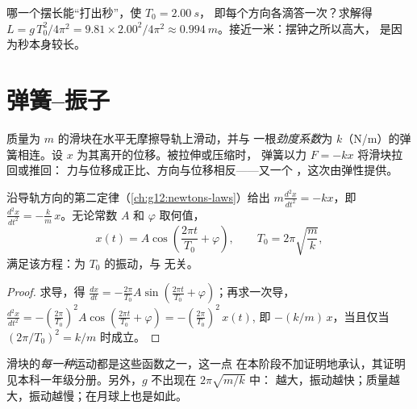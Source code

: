 \begin{example}[秒摆]\label{ex:g12:oscillators-and-time:seconds}
哪一个摆长能“打出秒”，使 $T_0 = \qty{2.00}{s}$，
即每个方向各滴答一次？求解得 $L = g\,T_0^2/4\pi^2 = 9.81 \times 2.00^2/4\pi^2 \approx
\qty{0.994}{m}$。接近一米：摆钟之所以高大，
是因为秒本身较长。
\end{example}

\section{弹簧–振子}

\begin{definition}[弹簧的回复力]\label{def:g12:oscillators-and-time:spring}
质量为 $m$ 的滑块在水平无摩擦导轨上滑动，并与
一根\emph{劲度系数}为 $k$（\unit{N/m}）的弹簧相连。设
$x$ 为其离开的位移。被拉伸或压缩时，
弹簧以力 $F = -kx$ 将滑块拉回或推回：
力与位移成正比、方向与位移相反——又一个
，这次由弹性提供。
\end{definition}

\begin{proposition}[运动方程及其解]\label{prop:g12:oscillators-and-time:spring-period}
沿导轨方向的第二定律（\cref{ch:g12:newtons-laws}）给出
$m \frac{d^2x}{dt^2} = -kx$，即 $\frac{d^2x}{dt^2} =
-\frac{k}{m}\,x$。无论常数 $A$ 和 $\varphi$ 取何值，
\[
x(t) = A \cos\!\left(\frac{2\pi t}{T_0} + \varphi\right),
\qquad T_0 = 2\pi\sqrt{\frac{m}{k}},
\]
满足该方程：为 $T_0$ 的振动，与
无关。
\end{proposition}

\begin{proof}
求导，得 $\frac{dx}{dt} = -\frac{2\pi}{T_0}A \sin(\frac{2\pi
t}{T_0} + \varphi)$；再求一次导，$\frac{d^2x}{dt^2} = -(\frac{2\pi}{T_0})^2
A\cos(\frac{2\pi t}{T_0} + \varphi) = -(\frac{2\pi}{T_0})^2\,x(t)$,
即 $-(k/m)\,x$，当且仅当 $(2\pi/T_0)^2 = k/m$ 时成立。
\end{proof}

\begin{remark}[所有可能的运动]\label{rem:g12:oscillators-and-time:uniqueness}
滑块的\emph{每一种}运动都是这些函数之一，这一点
在本阶段不加证明地承认，其证明见本科一年级分册。另外，$g$ 不出现在 $2\pi\sqrt{m/k}$ 中：
越大，振动越快；质量越大，振动越慢；在月球上也是如此。
\end{remark}

